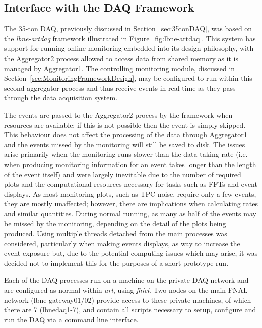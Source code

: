 \subsection{Interface with the DAQ Framework}

The 35-ton DAQ, previously discussed in Section~\ref{sec:35tonDAQ}, was based on the \textit{lbne-artdaq} framework illustrated in Figure~\ref{fig:lbne-artdaq}.  This system has support for running online monitoring embedded into its design philosophy, with the Aggregator2 process allowed to access data from shared memory as it is managed by Aggregator1.  The controlling monitoring module, discussed in Section~\ref{sec:MonitoringFrameworkDesign}, may be configured to run within this second aggregator process and thus receive events in real-time as they pass through the data acquisition system.

The events are passed to the Aggregator2 process by the framework when resources are available; if this is not possible then the event is simply skipped.  This behaviour does not affect the processing of the data through Aggregator1 and the events missed by the monitoring will still be saved to disk.  The issues arise primarily when the monitoring runs slower than the data taking rate (i.e. when producing monitoring information for an event takes longer than the length of the event itself) and were largely inevitable due to the number of required plots and the computational resources necessary for tasks such as FFTs and event displays.  As most monitoring plots, such as TPC noise, require only a few events, they are mostly unaffected; however, there are implications when calculating rates and similar quantities.  During normal running, as many as half of the events may be missed by the monitoring, depending on the detail of the plots being produced.  Using multiple threads detached from the main processes was considered, particularly when making events displays, as way to increase the event exposure but, due to the potential computing issues which may arise, it was decided not to implement this for the purposes of a short prototype run.

Each of the DAQ processes run on a machine on the private DAQ network and are configured as normal within \textit{art}, using \textit{fhicl}.  Two nodes on the main FNAL network (lbne-gateway01/02) provide access to these private machines, of which there are 7 (lbnedaq1-7), and contain all scripts necessary to setup, configure and run the DAQ via a command line interface.

